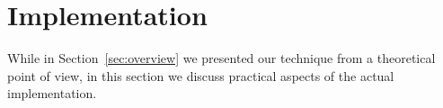 \documentclass[sigconf,review,anonymous]{acmart}
\begin{document}




 









  \section{Implementation}

  While in Section~\ref{sec:overview} we presented our technique from a theoretical point of view,   in this section we discuss practical aspects of the actual implementation.  
\end{document}
